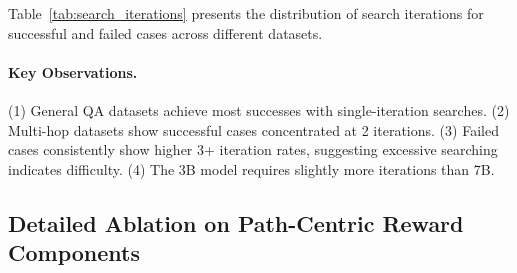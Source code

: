 \documentclass[11pt]{article}
\begin{document}
Table~\ref{tab:search_iterations} presents the distribution of search iterations for successful and failed cases across different datasets.

\paragraph{Key Observations.} (1) General QA datasets achieve most successes with single-iteration searches. (2) Multi-hop datasets show successful cases concentrated at 2 iterations. (3) Failed cases consistently show higher 3+ iteration rates, suggesting excessive searching indicates difficulty. (4) The 3B model requires slightly more iterations than 7B.

\subsection{Detailed Ablation on Path-Centric Reward Components}
\label{sec:appendix_ablation_process}
\end{document}
